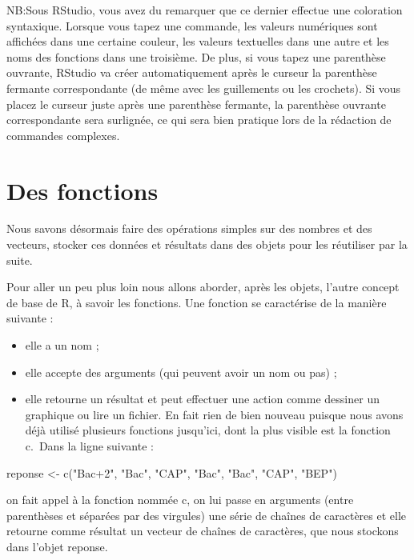 \documentclass[
]{book}
\newenvironment{Shaded}{\begin{snugshade}}{\end{snugshade}}
\newcommand{\FunctionTok}[1]{\textcolor[rgb]{0.00,0.00,0.00}{#1}}
\newcommand{\NormalTok}[1]{#1}
\newcommand{\OtherTok}[1]{\textcolor[rgb]{0.56,0.35,0.01}{#1}}
\newcommand{\StringTok}[1]{\textcolor[rgb]{0.31,0.60,0.02}{#1}}
\providecommand{\tightlist}{%
  \setlength{\itemsep}{0pt}\setlength{\parskip}{0pt}}
\begin{document}
NB:Sous RStudio, vous avez du remarquer que ce dernier effectue une coloration syntaxique. Lorsque vous tapez une commande, les valeurs numériques sont affichées dans une certaine couleur, les valeurs textuelles dans une autre et les noms des fonctions dans une troisième. De plus, si vous tapez une parenthèse ouvrante, RStudio va créer automatiquement après le curseur la parenthèse fermante correspondante (de même avec les guillements ou les crochets). Si vous placez le curseur juste après une parenthèse fermante, la parenthèse ouvrante correspondante sera surlignée, ce qui sera bien pratique lors de la rédaction de commandes complexes.

\hypertarget{des-fonctions}{%
\section{Des fonctions}\label{des-fonctions}}

Nous savons désormais faire des opérations simples sur des nombres et des vecteurs, stocker ces données et résultats dans des objets pour les réutiliser par la suite.

Pour aller un peu plus loin nous allons aborder, après les objets, l'autre concept de base de R, à savoir les fonctions. Une fonction se caractérise de la manière suivante :

\begin{itemize}
\tightlist
\item
  elle a un nom ;
\item
  elle accepte des arguments (qui peuvent avoir un nom ou pas) ;
\item
  elle retourne un résultat et peut effectuer une action comme dessiner un graphique ou lire un fichier.
  En fait rien de bien nouveau puisque nous avons déjà utilisé plusieurs fonctions jusqu'ici, dont la plus visible est la fonction c.~Dans la ligne suivante :
\end{itemize}

\begin{Shaded}
\begin{Highlighting}[]
\NormalTok{reponse }\OtherTok{\textless{}{-}} \FunctionTok{c}\NormalTok{(}\StringTok{"Bac+2"}\NormalTok{, }\StringTok{"Bac"}\NormalTok{, }\StringTok{"CAP"}\NormalTok{, }\StringTok{"Bac"}\NormalTok{, }\StringTok{"Bac"}\NormalTok{, }\StringTok{"CAP"}\NormalTok{, }\StringTok{"BEP"}\NormalTok{)}
\end{Highlighting}
\end{Shaded}

on fait appel à la fonction nommée c, on lui passe en arguments (entre parenthèses et séparées par des virgules) une série de chaînes de caractères et elle retourne comme résultat un vecteur de chaînes de caractères, que nous stockons dans l'objet reponse.
\end{document}
